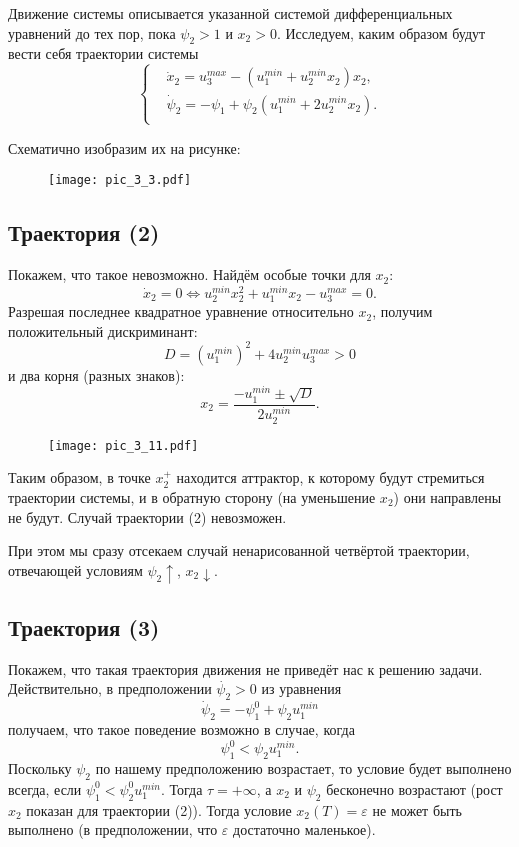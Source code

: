 Движение системы описывается указанной системой дифференциальных уравнений до тех пор, пока $\psi_2 > 1$ и $x_2 > 0$. Исследуем, каким образом будут вести себя траектории системы 
$$
    \left\{
    \begin{aligned}
        & \dot{x}_2 = u_3^{max} - (u_1^{min} + u_2^{min} x_2) x_2, \\
        & \dot{\psi}_2 = - \psi_1 + \psi_2 (u_1^{min} + 2 u_2^{min} x_2). \\
    \end{aligned}
    \right.
$$

Схематично изобразим их на рисунке:

\begin{figure}[H]
    \centering
    \texttt{[image: pic\_3\_3.pdf]}
\end{figure}

\subsection*{Траектория (2)}
Покажем, что такое невозможно. Найдём особые точки для $x_2$:
$$
\dot{x}_2 = 0 \Leftrightarrow u_2^{min} x_2^2 + u_1^{min} x_2 - u_3^{max} = 0.
$$
Разрешая последнее квадратное уравнение относительно $x_2$, получим положительный дискриминант:
$$
D = \left(u_1^{min}\right)^2 + 4 u_2^{min} u_3^{max} > 0
$$
и два корня (разных знаков):
$$
    x_2 = \frac{- u_1^{min} \pm \sqrt{D}}{2 u_2^{min}}.
$$

\begin{figure}[H]
    \centering
    \texttt{[image: pic\_3\_11.pdf]}
\end{figure}

Таким образом, в точке $x_2^+$ находится аттрактор, к которому будут стремиться траектории системы, и в обратную сторону (на уменьшение $x_2$) они направлены не будут. Случай траектории (2) невозможен.

При этом мы сразу отсекаем случай ненарисованной четвёртой траектории, отвечающей условиям $\psi_2 \uparrow$, $x_2 \downarrow$.

\subsection*{Траектория (3)}
Покажем, что такая траектория движения не приведёт нас к решению задачи. Действительно, в предположении $\dot{\psi_2} > 0$ из уравнения
$$
\dot{\psi}_2 = -\psi_1^0 + \psi_2 u_1^{min}
$$
получаем, что такое поведение возможно в случае, когда
$$
\psi_1^0 < \psi_2 u_1^{min}.
$$
Поскольку $\psi_2$ по нашему предположению возрастает, то условие будет выполнено всегда, если $\psi_1^0 < \psi_2^0 u_1^{min}$. Тогда $\tau = +\infty$, а $x_2$ и $\psi_2$ бесконечно возрастают (рост $x_2$ показан для траектории (2)). Тогда условие $x_2(T) = \varepsilon$ не может быть выполнено (в предположении, что $\varepsilon$ достаточно маленькое).

